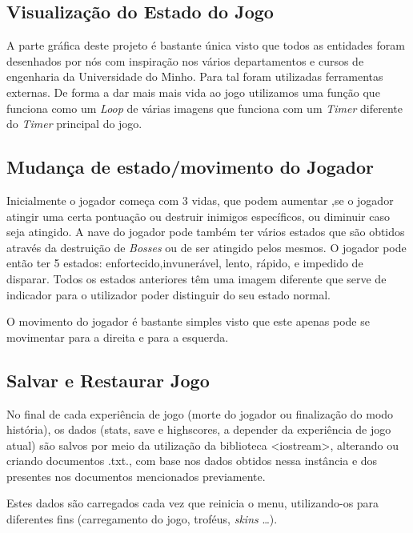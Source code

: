 \documentclass[a4paper,11pt]{article}
\newcommand\tab[1][0.8cm]{\hspace*{#1}}
\begin{document}
\subsection{Visualização do Estado do Jogo}
 \tab A parte gráfica deste projeto é bastante única visto que todos as entidades foram desenhados por nós com inspiração nos vários departamentos e cursos de engenharia da Universidade do Minho. Para tal foram utilizadas ferramentas externas. De forma a dar mais mais vida ao jogo utilizamos uma função que funciona como um \textit{Loop} de várias imagens que funciona com um \textit{Timer} diferente do \textit{Timer} principal do jogo.

\subsection{Mudança de estado/movimento do Jogador}
\tab Inicialmente o jogador começa com 3 vidas, que podem aumentar ,se o jogador atingir uma certa pontuação ou destruir inimigos específicos, ou diminuir caso seja atingido. A nave do jogador pode também ter vários estados que são obtidos através da destruição de \textit{Bosses} ou de ser atingido pelos mesmos. O jogador pode então ter 5 estados: enfortecido,invunerável, lento, rápido, e impedido de disparar. Todos os estados anteriores têm uma imagem diferente que serve de indicador para o utilizador poder distinguir do seu  estado normal. 

\vspace{8pt}
 O movimento do jogador é bastante simples visto que este apenas pode se movimentar para a direita e para a esquerda.
\pagebreak

\subsection{Salvar e Restaurar Jogo}

\vspace{8pt}

No final de cada experiência de jogo (morte do jogador ou finalização do modo história), os dados (stats, save e highscores, a depender da experiência de jogo atual) são salvos por meio da utilização da biblioteca <iostream>, alterando ou criando documentos .txt., com base nos dados obtidos nessa instância e dos presentes nos documentos mencionados previamente.

\vspace{8pt}

Estes dados são carregados cada vez que reinicia o menu, utilizando-os para diferentes fins (carregamento do jogo, troféus, \textit{skins} \dots).
\end{document}
